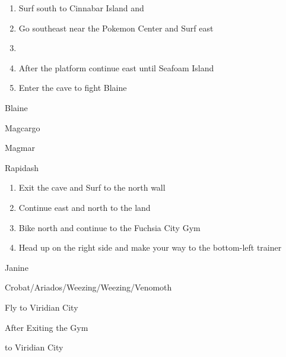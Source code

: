 \begin{paracol}{2}
\begin{enumerate}[resume]
	\item Surf south  to Cinnabar Island and 
	\item Go southeast near the Pokemon Center and Surf east
	\item {}
	\item After the platform continue east until Seafoam Island
	\item Enter the cave to fight Blaine
\end{enumerate}

\begin{boss}{Blaine}
	\varwb
	\begin{fightSection}{Magcargo}
		\item {} \surf
	\end{fightSection}
	\begin{fightSection}{Magmar}
		\item {} \return
	\end{fightSection}
	\begin{fightSection}{Rapidash}
		\item {} \surf
	\end{fightSection}
	\varwe
\end{boss}

\begin{enumerate}[resume]
	\item Exit the cave and Surf to the north wall
	\item Continue east and north to the land
	\item Bike north and continue to the Fuchsia City Gym
	\item Head up on the right side and make your way to the bottom-left trainer
\end{enumerate}

\begin{boss}{Janine}
	\varwb
	\begin{fightSection}{Crobat/Ariados/Weezing/Weezing/Venomoth}
		\item {} \return{} 
	\end{fightSection}
	\varwe
\end{boss}

\switchcolumn*
\vspace{-3.55cm}
\begin{story}{Fly to Viridian City}
	\varwb
	\varwe
\end{story}

\switchcolumn
\begin{menu}{After Exiting the Gym}
	\varwb
	\begin{pokeMenu}
		\item {} \fly{} to Viridian City \menuHlTwo{(2\pointUp)}
	\end{pokeMenu}
	\varwe
\end{menu}

\end{paracol}
\vspace{3.5mm} 